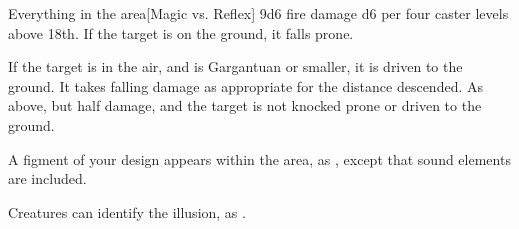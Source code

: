 \begin{spellheader}
    \spellrng{\rnglong}
\end{spellheader}
\begin{spelleffects}
    \begin{spelltargets}{Everything in the area}[Magic vs. Reflex]
        \spellsuccess 9d6 fire damage \add d6 per four caster levels above 18th. If the target is on the ground, it falls prone.

        If the target is in the air, and is Gargantuan or smaller, it is driven to the ground. It takes falling damage as appropriate for the distance descended.
        \spellfailure As above, but half damage, and the target is not knocked prone or driven to the ground.
    \end{spelltargets}
\end{spelleffects}
\begin{spellfooter}
    \spellnotes \firespellnotes

    \destructivespellnotes
\end{spellfooter}

\begin{spellheader}
    \spelldur{\durshort}
\end{spellheader}
\begin{spelleffects}
    \spellline
    \spelleffect A figment of your design appears within the area, as , except that sound elements are included.
\end{spelleffects}
\begin{spellfooter}
    \spellnotes Creatures can identify the illusion, as .
\end{spellfooter}

